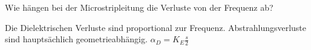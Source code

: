 \begin{question}[section=9,name={Microstripleitung},difficulty=,quantity=,type=thr,tags={20130513}]
	Wie hängen bei der Microstripleitung die Verluste von der Frequenz ab?
	
	
\end{question}
\begin{solution}
	Die Dielektrischen Verluste sind proportional zur Frequenz. Abstrahlungsverluste sind hauptsächlich geometrieabhängig.
	$\alpha_D = K_E \frac{s}{2}$
\end{solution}